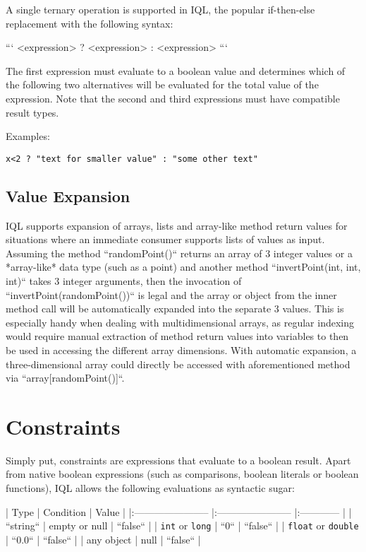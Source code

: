 \documentclass[11pt]{article}
\begin{document}
A single ternary operation is supported in IQL, the popular if-then-else replacement with the following syntax:

```
<expression> ? <expression> : <expression>
```

The first expression must evaluate to a boolean value and determines which of the following two alternatives will be evaluated for the total value of the expression. Note that the second and third expressions must have compatible result types.

Examples:

\begin{verbatim}
x<2 ? "text for smaller value" : "some other text"
\end{verbatim}

\subsection{Value Expansion}
\label{sec:value-expansion}

IQL supports expansion of arrays, lists and array-like method return values for situations where an immediate consumer supports lists of values as input. Assuming the method ``randomPoint()`` returns an array of 3 integer values or a *array-like* data type (such as a point) and another method ``invertPoint(int, int, int)`` takes 3 integer arguments, then the invocation of ``invertPoint(randomPoint())`` is legal and the array or object from the inner method call will be automatically expanded into the separate 3 values. This is especially handy when dealing with multidimensional arrays, as regular indexing would require manual extraction of method return values into variables to then be used in accessing the different array dimensions. With automatic expansion, a three-dimensional array could directly be accessed with aforementioned method via ``array[randomPoint()]``.

\section{Constraints}
\label{sec:cosntraints}

Simply put, constraints are expressions that evaluate to a boolean result. Apart from native boolean expressions (such as comparisons, boolean literals or boolean functions), IQL allows the following evaluations as syntactic sugar:

|      Type               |       Condition         |    Value     |
|:----------------------- |:----------------------- |:------------ |
| ``string``              | empty or null           | ``false``    | 
| \texttt{int} or \texttt{long}     | ``0``                   | ``false``    |
| \texttt{float} or \texttt{double} | ``0.0``                 | ``false``    |
| any object              | null                    | ``false``    |
\end{document}
